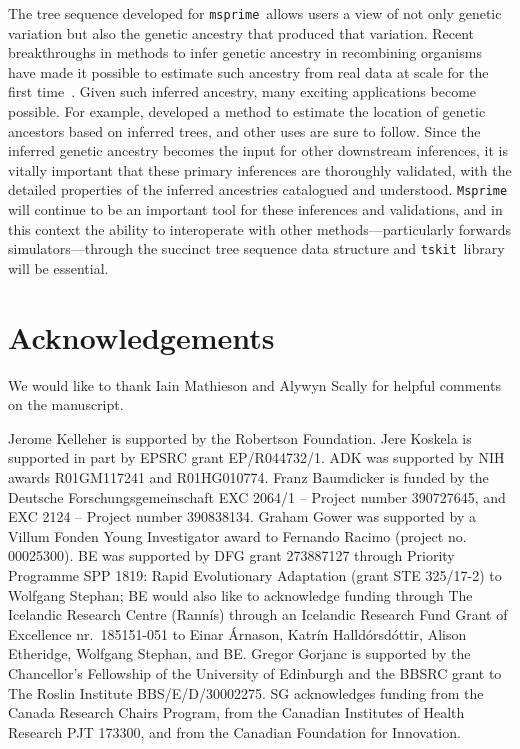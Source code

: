 \documentclass{article}
\newcommand{\msprime}[0]{\texttt{msprime}}
\newcommand{\tskit}[0]{\texttt{tskit}}
\begin{document}
The tree sequence developed for \msprime\ allows users a view of not only
genetic variation but also the genetic ancestry that produced that variation.
Recent breakthroughs in methods to infer genetic ancestry in recombining
organisms~\citep{kelleher2019inferring,
speidel2019method,wohns2021unified,schaefer2021ancestral,speidel2021inferring}
have made it possible to estimate such ancestry from real data at scale for
the first time~\citep{harris2019database,tang2019genealogy}.
Given such inferred ancestry, many exciting applications
become possible. For example, \cite{osmond2021estimating}
developed a method to estimate the location of genetic ancestors
based on inferred trees, and other uses are sure to follow.
Since the inferred genetic ancestry
becomes the input for other downstream inferences, it is vitally
important that these primary inferences are thoroughly validated,
with the detailed properties of the inferred ancestries
catalogued and understood.
\texttt{Msprime} will continue to be an important tool for these inferences and validations,
and in this context the ability to interoperate
with other methods---particularly forwards simulators---through
the succinct tree sequence data structure and \tskit\ library
will be essential.

\section*{Acknowledgements}
We would like to thank Iain Mathieson and Alywyn Scally for helpful comments
on the manuscript.

Jerome Kelleher is supported by the Robertson Foundation.
Jere Koskela is supported in part by EPSRC grant EP/R044732/1.
ADK was supported by NIH awards R01GM117241 and R01HG010774.
Franz Baumdicker is funded by the Deutsche Forschungsgemeinschaft
EXC 2064/1 -- Project number 390727645, and EXC 2124 -- Project number 390838134.
Graham Gower was supported by a Villum Fonden Young Investigator award to Fernando Racimo (project no. 00025300).
BE was supported by  DFG grant  273887127 through Priority
Programme SPP 1819: Rapid Evolutionary Adaptation (grant STE 325/17-2) to Wolfgang Stephan; BE would also like to acknowledge  funding through The Icelandic Research
Centre (Rann{\'i}s) through an Icelandic Research Fund Grant of  Excellence nr.\ 185151-051 to Einar \'Arnason,  Katr\'in Halld\'orsd\'ottir,  Alison Etheridge,  Wolfgang Stephan, and BE.
Gregor Gorjanc is supported by the Chancellor's Fellowship of the University of
Edinburgh and the BBSRC grant to The Roslin Institute BBS/E/D/30002275.
SG acknowledges funding from the Canada Research Chairs Program, from the
Canadian Institutes of Health Research PJT 173300, and from the Canadian
Foundation for Innovation.
\end{document}
